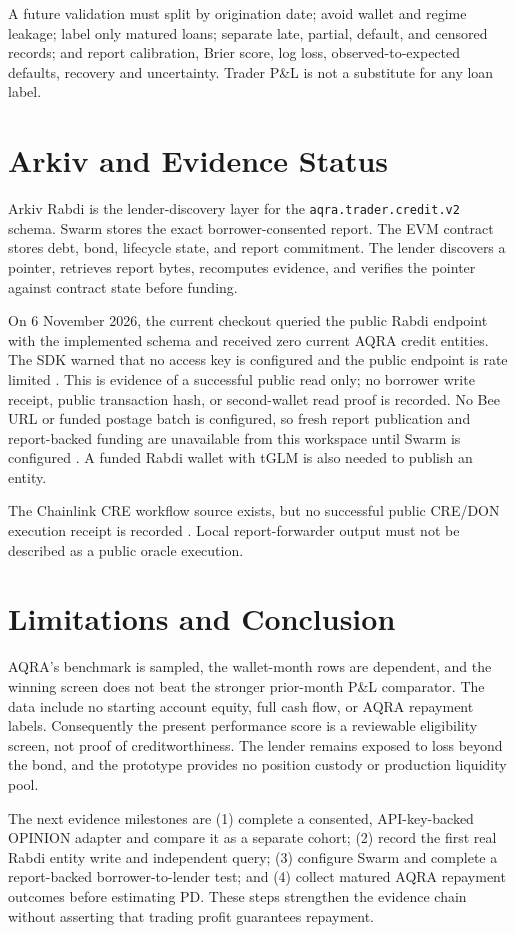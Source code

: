 \documentclass[conference]{IEEEtran}
\begin{document}
A future validation must split by origination date; avoid wallet and regime leakage; label only matured loans; separate late, partial, default, and censored records; and report calibration, Brier score, log loss, observed-to-expected defaults, recovery and uncertainty. Trader P\&L is not a substitute for any loan label.

\section{Arkiv and Evidence Status}
Arkiv Rabdi is the lender-discovery layer for the \texttt{aqra.trader.credit.v2} schema. Swarm stores the exact borrower-consented report. The EVM contract stores debt, bond, lifecycle state, and report commitment. The lender discovers a pointer, retrieves report bytes, recomputes evidence, and verifies the pointer against contract state before funding.

On 6 November 2026, the current checkout queried the public Rabdi endpoint with the implemented schema and received zero current AQRA credit entities. The SDK warned that no access key is configured and the public endpoint is rate limited \cite{arkiv-rabdi,arkiv-entity}. This is evidence of a successful public read only; no borrower write receipt, public transaction hash, or second-wallet read proof is recorded. No Bee URL or funded postage batch is configured, so fresh report publication and report-backed funding are unavailable from this workspace until Swarm is configured \cite{swarm-upload}. A funded Rabdi wallet with tGLM is also needed to publish an entity.

The Chainlink CRE workflow source exists, but no successful public CRE/DON execution receipt is recorded \cite{chainlink-cre}. Local report-forwarder output must not be described as a public oracle execution.

\section{Limitations and Conclusion}
AQRA's benchmark is sampled, the wallet-month rows are dependent, and the winning screen does not beat the stronger prior-month P\&L comparator. The data include no starting account equity, full cash flow, or AQRA repayment labels. Consequently the present performance score is a reviewable eligibility screen, not proof of creditworthiness. The lender remains exposed to loss beyond the bond, and the prototype provides no position custody or production liquidity pool.

The next evidence milestones are (1) complete a consented, API-key-backed OPINION adapter and compare it as a separate cohort; (2) record the first real Rabdi entity write and independent query; (3) configure Swarm and complete a report-backed borrower-to-lender test; and (4) collect matured AQRA repayment outcomes before estimating PD. These steps strengthen the evidence chain without asserting that trading profit guarantees repayment.



\end{document}
